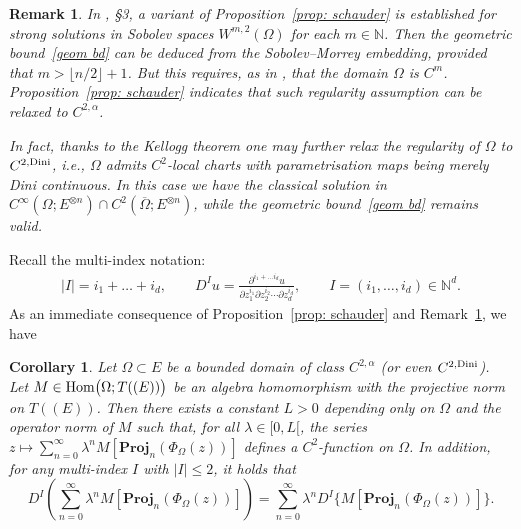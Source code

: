 \documentclass[11pt,a4paper,english,reqno]{amsart}
\theoremstyle{plain}
\newtheorem{remark}[definition]{Remark}
\newtheorem{corollary}[definition]{Corollary}
\newcommand{\1}{\mathbbm{1}}
\newcommand{\proj}{\mathbf{Proj}}
\begin{document}
\begin{remark}\label{rem: elliptic}
In \cite{lyons2015expected}, \S 3, a variant of Proposition~\ref{prop: schauder} is established for  strong solutions in Sobolev spaces $W^{m,2}(\Omega)$ for each $m \in \mathbb{N}$. Then the geometric bound~\eqref{geom bd} can be deduced from the  Sobolev--Morrey embedding, provided that $m > \lfloor n\slash 2 \rfloor +1$. But this requires, as in \cite{lyons2015expected},  that the domain $\Omega$ is $C^m$. Proposition~\ref{prop: schauder} indicates that such regularity assumption can be relaxed to $C^{2,\alpha}$. 


In fact, thanks to the Kellogg theorem \cite{kellogg} one may further relax the regularity of $\Omega$ to $C^{2, {\rm Dini}}$, {\it i.e.}, $\Omega$ admits $C^2$-local charts with parametrisation maps being merely Dini continuous. In this case we have the classical solution in $C^\infty\left(\Omega; E^{\otimes n}\right) \cap C^{2}\left(\overline{\Omega}; E^{\otimes n}\right)$, while the geometric bound~\eqref{geom bd} remains valid.

\end{remark}

Recall the multi-index notation:
\begin{eqnarray*}
\left|I\right|=i_1+\ldots+i_d,
\qquad
D^Iu=\frac{\partial^{i_{1}+\ldots i_d}u}{\partial z_{1}^{i_{1}}\partial z_{2}^{i_{2}}\cdots\partial z_{d}^{i_{d}}},
\qquad
I=\left(i_{1},\ldots,i_d\right)\in\mathbb{N}^{d}.
\end{eqnarray*}
As an immediate consequence of Proposition~\ref{prop: schauder} and Remark~\ref{rem: elliptic}, we have
\begin{corollary}\label{cor: differentiability}
Let $\Omega \subset E$ be a bounded domain of class $C^{2,\alpha}$ (or even  $C^{2,{\rm Dini}}$). Let $M \in {\rm Hom}\big(\Omega;T((E))\big)$ be an algebra homomorphism with the projective norm on $T((E))$. Then there exists a constant $L>0$ depending only on $\Omega$ and the operator norm of $M$ such that, for all $\lambda \in [0,L[$, the series $z\mapsto\sum_{n=0}^{\infty}\lambda^{n}M\left[\proj_{n}\left(\Phi_{\Omega}(z)\right)\right]$ defines a $C^2$-function on $\Omega$. In addition, for any multi-index $I$ with  $|I|\leq 2$, it holds that
\begin{equation*}
  D^{I}\left(\sum_{n=0}^{\infty}\lambda^{n}M\left[\proj_{n}\left(\Phi_{\Omega}(z)\right)\right]\right)
=  \sum_{n=0}^{\infty}\lambda^{n}D^{I}\Big\{M\left[\proj_{n}\left(\Phi_{\Omega}(z)\right)\right]\Big\}.
\end{equation*}
\end{corollary}
\end{document}
